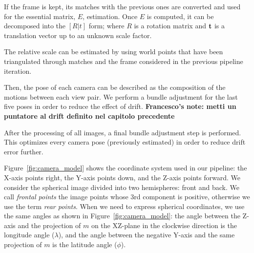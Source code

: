 If the frame is kept, its matches with the previous ones are converted
and used for the essential matrix, $E$, estimation. Once $E$ is computed, 
it can be decomposed into the \([R|t]\) form; where $R$ is a rotation matrix 
and $\mathbf{t}$ is a translation vector up to an unknown scale factor.

The relative scale can be estimated by using world points that have been 
triangulated through matches and the frame considered in the previous pipeline 
iteration.

Then, the pose of each camera can be described as the composition of the 
motions between each view pair. We perform a bundle adjustment for the last five 
poses in order to reduce the effect of drift.
\textbf{Francesco's note: metti un puntatore al drift definito nel capitolo precedente}

After the processing of all images, a final bundle adjustment step is performed. 
This optimizes every camera pose (previously estimated) in order to reduce drift error further.

Figure~\ref{fig:camera_model} shows the coordinate system used in our pipeline: the X-axis points right, the Y-axis points down, and the Z-axis points forward. We consider the spherical image divided into two hemispheres: front and back. We call \textit{frontal points} the image points whose 3rd component is positive, otherwise we use the term \textit{rear points}.
When we need to express spherical coordinates, we use the same angles as shown in 
Figure~\ref{fig:camera_model}:
the angle between the Z-axis and the projection of $m$ on the XZ-plane in 
the clockwise direction is the longitude angle ($\lambda$), and the angle 
between the negative Y-axis and the same projection of $m$ is the latitude 
angle ($\phi$).

